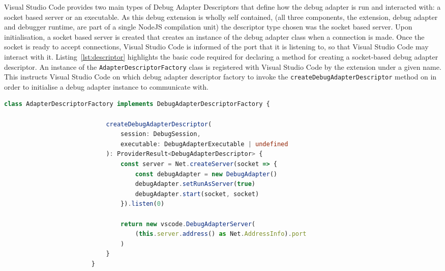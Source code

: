 \documentclass[12pt,pdftex,titlepage]{report}
\begin{document}
                \newpage
                Visual Studio Code provides two main types of Debug Adapter Descriptors that define how the debug adapter is run and interacted with: a socket based server or an executable. As this debug extension is wholly self contained, 
                (all three components, the extension, debug adapter and debugger runtime, are part of a single NodeJS compilation unit) the descriptor type chosen was the socket based server. Upon initialisation, a socket based server is 
                created that creates an instance of the debug adapter class when a connection is made. Once the socket is ready to accept connections, Visual Studio Code is informed of the port that it is listening to, so that Visual Studio 
                Code may interact with it. Listing~\ref{lst:descriptor} highlights the basic code required for declaring a method for creating a socket-based debug adapter descriptor. An instance of the \texttt{AdapterDescriptorFactory} class 
                is registered with Visual Studio Code by the extension under a given name. This instructs Visual Studio Code on which debug adapter descriptor factory to invoke the \texttt{createDebugAdapterDescriptor} method on in order to 
                initialise a debug adapter instance to communicate with.

                \newpage
                \begin{spacing}{1.0}
                    \begin{lstlisting}[label={lst:descriptor}, gobble=24, language=Typescript, caption={The method used to initialise the Debug Adapter and return the Debug Adapter Descriptor to Visual Studio Code.}]
                        class AdapterDescriptorFactory implements DebugAdapterDescriptorFactory {
                            
                            createDebugAdapterDescriptor(
                                session: DebugSession,
                                executable: DebugAdapterExecutable | undefined
                            ): ProviderResult<DebugAdapterDescriptor> {
                                const server = Net.createServer(socket => {
                                    const debugAdapter = new DebugAdapter()
                                    debugAdapter.setRunAsServer(true)
                                    debugAdapter.start(socket, socket)
                                }).listen(0)

                                return new vscode.DebugAdapterServer(
                                    (this.server.address() as Net.AddressInfo).port
                                )
                            }
                        }
                    \end{lstlisting}
                \end{spacing}
\end{document}
